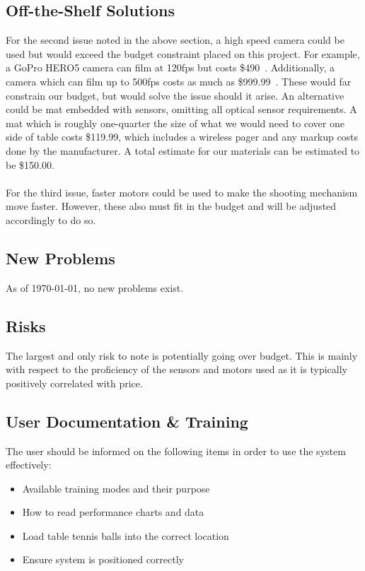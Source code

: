 \documentclass[11pt]{article}
\begin{document}
\subsection{Off-the-Shelf Solutions}
For the second issue noted in the above section, a high speed camera could be used but would exceed the budget constraint placed on this project. For example, a GoPro HERO5 camera can film at 120fps but costs \$490~\autocite{amazon-gopro}.
Additionally, a camera which can film up to 500fps costs as much as \$999.99~\autocite{all-sport}.
These would far constrain our budget, but would solve the issue should it arise. An alternative could be mat embedded with sensors, omitting all optical sensor requirements. A mat which is roughly one-quarter the size of what we would need to cover one side of table costs \$119.99, which includes a wireless pager and any markup costs done by the manufacturer. A total estimate for our materials can be estimated to be \$150.00.\\\\
For the third issue, faster motors could be used to make the shooting mechanism move faster. However, these also must fit in the budget and will be adjusted accordingly to do so.
\subsection{New Problems}
As of \today, no new problems exist.
\subsection{Risks}
The largest and only risk to note is potentially going over budget. This is mainly with respect to the proficiency of the sensors and motors used as it is typically positively correlated with price. 
\subsection{User Documentation \& Training}
The user should be informed on the following items in order to use the system effectively:
\begin{itemize}
\item Available training modes and their purpose
\item How to read performance charts and data
\item Load table tennis balls into the correct location
\item Ensure system is positioned correctly
\end{itemize}
\end{document}
